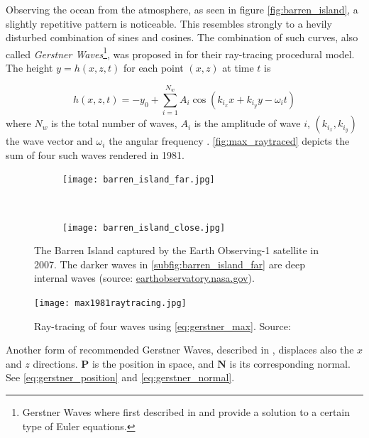 Observing the ocean from the atmosphere, as seen in figure
\autoref{fig:barren_island}, a slightly repetitive pattern is noticeable. This
resembles strongly to a hevily disturbed combination of sines and cosines. The
combination of such curves, also called \textit{Gerstner
Waves}\footnote{Gerstner Waves where first described in
\autocite{gerstner1802theorie} and provide a solution to a certain type of
Euler equations.}, was proposed in \autocite{max1981vectorized} for their
ray-tracing procedural model. The height $y = h(x,z,t)$ for each point $(x,z)$
at time $t$ is

\begin{equation}\label{eq:gerstner_max}
    h(x, z, t) = -y_0 + \sum_{i = 1}^{N_w} A_i \cos(k_{i_x}x + k_{i_y}y -
    \omega_i t)
\end{equation}
%
where $N_w$ is the total number of waves, $A_i$ is the amplitude of wave $i$,
$(k_{i_x}, k_{i_y})$ the wave vector and $\omega_i$ the angular frequency
\autocite{max1981vectorized,darles2011survey}. \autoref{fig:max_raytraced}
depicts the sum of four such waves rendered in 1981.

\begin{figure}[hbt!]
    \centering
    \begin{subfigure}[hbt]{\textwidth}
        \centering
        \texttt{[image: barren\_island\_far.jpg]}
        \label{subfig:barren_island_far}
    \end{subfigure}\\%
    \begin{subfigure}[hbt]{\textwidth}
        \centering
        \texttt{[image: barren\_island\_close.jpg]}
        \label{subfig:barren_island_close}
    \end{subfigure}
    \caption{The Barren Island captured by the Earth Observing-1 satellite in
        2007. The darker waves in \autoref{subfig:barren_island_far} are
        deep internal waves (source:
        \url{earthobservatory.nasa.gov}).}\label{fig:barren_island}
\end{figure}

\begin{figure}[hbt]
    \centering
    \texttt{[image: max1981raytracing.jpg]}
    \caption{Ray-tracing of four waves using \autoref{eq:gerstner_max}. Source:
    \autocite{max1981vectorized}}\label{fig:max_raytraced}
\end{figure}

Another form of recommended Gerstner Waves, described in
\autocite[Chapter~1]{fernando2004gpu}, displaces also the $x$ and $z$
directions. $\textbf{P}$ is the position in space, and $\textbf{N}$ is its
corresponding normal. See \autoref{eq:gerstner_position} and
\autoref{eq:gerstner_normal}.

